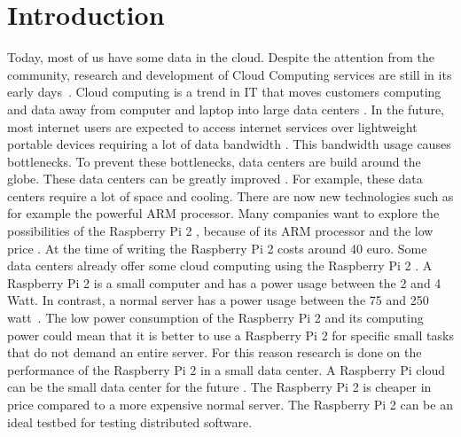 \documentclass{sig-alternate-br}
\begin{document}
\section{Introduction}
Today, most of us have some data in the cloud. Despite the attention from the community, research and development of Cloud Computing services are still in its early days~\citep{tso:2013}. \newline
Cloud computing is a trend in IT that moves customers computing and data away from computer and laptop into large data centers \citep{dikaiakos:2009}. In the future, most internet users are expected to access internet services over lightweight portable devices requiring a lot of data bandwidth \cite{dikaiakos:2009}. This bandwidth usage causes bottlenecks. To prevent these bottlenecks, data centers are build around the globe. These data centers can be greatly improved \cite{abrahamsson:2013,beloglazov:2010}. 
For example, these data centers require a lot of space and cooling. There are now new technologies such as for example the powerful ARM processor. Many companies want to explore the possibilities of the Raspberry Pi 2 , because of its ARM processor and the low price \cite{Pcextreme}. At the time of writing the Raspberry Pi 2 costs around 40 euro. Some data centers already offer some cloud computing using the Raspberry Pi 2 \cite{Pcextreme}. \newline
A Raspberry Pi 2 is a small computer and has a power usage between the 2 and 4 Watt. In contrast, a normal server has a power usage between the 75 and 250 watt~\cite{Pcextreme,beloglazov2012energy}. The low power consumption of the Raspberry Pi 2 and its computing power could mean that it is better to use a Raspberry Pi 2 for specific small tasks that do not demand an entire server. For this reason research is done on the performance of the Raspberry Pi 2 in a small data center. \newline
A Raspberry Pi cloud can be the small data center for the future \cite{tso:2013}. The Raspberry Pi 2 is cheaper in price compared to a more expensive normal server. The Raspberry Pi 2 can be an ideal testbed for testing distributed software. 
\end{document}
